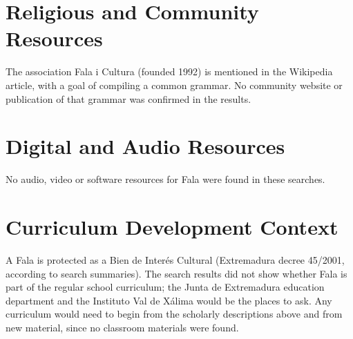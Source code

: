 \documentclass[12pt]{article}
\begin{document}
\section{Religious and Community Resources}
The association Fala i Cultura (founded 1992) is mentioned in the Wikipedia article, with a goal of compiling a common grammar. No community website or publication of that grammar was confirmed in the results.

\section{Digital and Audio Resources}
No audio, video or software resources for Fala were found in these searches.

\section{Curriculum Development Context}
A Fala is protected as a Bien de Inter\'es Cultural (Extremadura decree 45/2001, according to search summaries). The search results did not show whether Fala is part of the regular school curriculum; the Junta de Extremadura education department and the Instituto Val de X\'alima would be the places to ask. Any curriculum would need to begin from the scholarly descriptions above and from new material, since no classroom materials were found.
\end{document}
